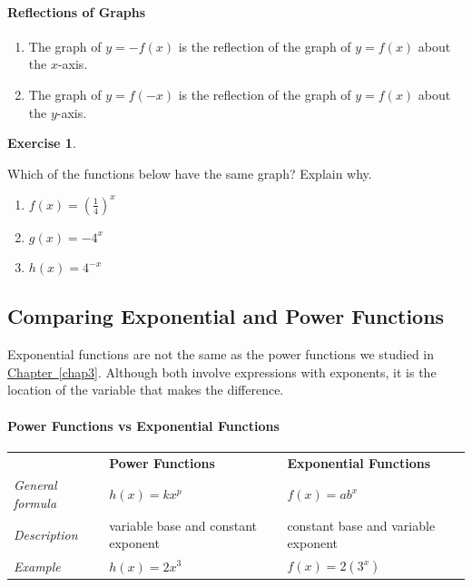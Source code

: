 \documentclass[10pt,]{book}
\newcommand{\terminology}[1]{\textbf{#1}}
\theoremstyle{plain}
\theoremstyle{definition}
\theoremstyle{definition}
\theoremstyle{definition}
\theoremstyle{definition}
\theoremstyle{definition}
\newtheorem{exercise}[theorem]{Exercise}
\numberwithin{equation}{section}
\begin{document}
\paragraph[Reflections of Graphs]{Reflections of Graphs}\label{paragraphs-60}
\index{}\leavevmode%
\begin{enumerate}
\item\hypertarget{li-667}{}
		The graph of \(y = −f (x)\) is the reflection of the graph of \(y = f (x)\) about the \(x\)-axis.
	\item\hypertarget{li-668}{}
		The graph of \(y = f (−x)\) is the reflection of the graph of \(y = f (x)\) about the \(y\)-axis.
	\end{enumerate}
\begin{exercise}\label{exercise-exponential-flips}

	Which of the functions below have the same graph? Explain why.
	\leavevmode%
\begin{enumerate}[label=*\alph**]
\item\hypertarget{li-669}{}\(f (x) =\left(\frac{1}{4}\right)^x\)\item\hypertarget{li-670}{}\(g(x) = −4^x\)\item\hypertarget{li-671}{}\(h(x) = 4^{−x}\)\end{enumerate}
\end{exercise}
\typeout{************************************************}
\typeout{************************************************}
\subsection[Comparing Exponential and Power Functions]{Comparing Exponential and Power Functions}\label{subsection-93}

	Exponential functions\index{} are not the same as the power functions \index{} we studied in \hyperref[chap3]{Chapter~\ref{chap3}}. Although both involve expressions with exponents, it is the location of the variable that makes the difference.
%
\typeout{************************************************}
\typeout{************************************************}
\paragraph[Power Functions vs Exponential Functions]{Power Functions vs Exponential Functions}\label{paragraphs-61}
\leavevmode%
\begin{table}
\centering
\begin{tabular}{lll}
&\terminology{Power Functions}&\terminology{Exponential Functions}\tabularnewline[0pt]
\emph{General formula}&\(h(x)=kx^p\)&\(f(x)=ab^x\)\tabularnewline[0pt]
\emph{Description}&variable base and constant exponent&constant base and variable exponent&\tabularnewline[0pt]
\emph{Example}&\(h(x)=2x^3\)&\(f(x)=2(3^x)\)&
\end{tabular}
\end{table}
\par
\end{document}
